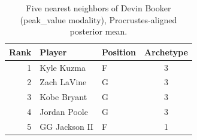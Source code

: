 \begin{table}[htbp]
  \centering\small
  \begin{tabular}{rllc}
    \toprule
    Rank & Player & Position & Archetype \\
    \midrule
    1 & Kyle Kuzma & F & 3 \\
    2 & Zach LaVine & G & 3 \\
    3 & Kobe Bryant & G & 3 \\
    4 & Jordan Poole & G & 3 \\
    5 & GG Jackson II & F & 1 \\
    \bottomrule
  \end{tabular}
  \caption{Five nearest neighbors of Devin Booker (peak_value modality), Procrustes-aligned posterior mean.}
  \label{tab:Devin_Booker_neighbors_peak_value}
\end{table}


